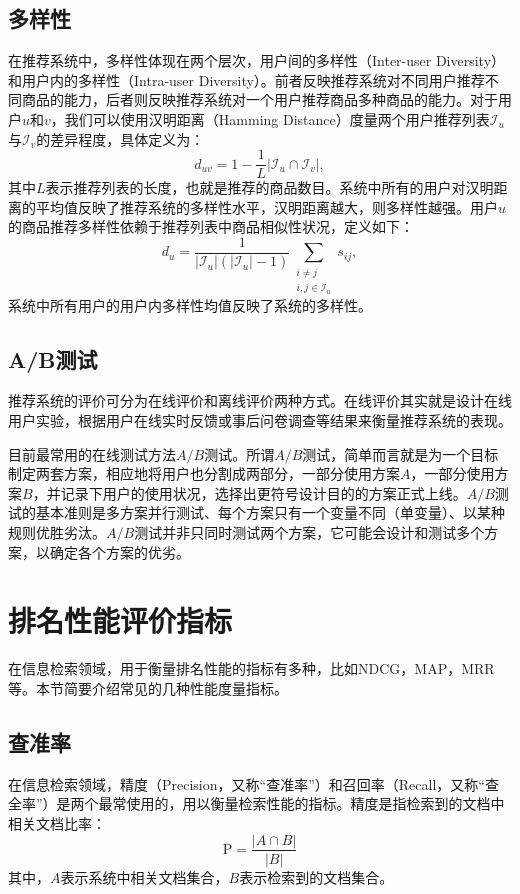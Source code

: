 \subsection{多样性}
在推荐系统中，多样性体现在两个层次，用户间的多样性（Inter-user Diversity）和用户内的多样性（Intra-user Diversity）。前者反映推荐系统对不同用户推荐不同商品的能力，后者则反映推荐系统对一个用户推荐商品多种商品的能力。对于用户$u$和$v$，我们可以使用汉明距离（Hamming Distance）度量两个用户推荐列表$\mathcal I_u$与$\mathcal I_v$的差异程度，具体定义为：
\begin{equation}\label{eq:inter-diversity}
    d_{uv} = 1 - \frac{1}{L} |\mathcal I_u \cap \mathcal I_v|,
\end{equation}
其中$L$表示推荐列表的长度，也就是推荐的商品数目。系统中所有的用户对汉明距离的平均值反映了推荐系统的多样性水平，汉明距离越大，则多样性越强。用户$u$的商品推荐多样性依赖于推荐列表中商品相似性状况，定义如下：
\begin{equation}\label{eq:intra-diversity}
    d_u = \frac{1}{|\mathcal I_u|(|\mathcal I_u|-1)} \sum\limits_{\substack{i\ne j\\i,j \in \mathcal I_u}} s_{ij},
\end{equation}
系统中所有用户的用户内多样性均值反映了系统的多样性。

\subsection{A/B测试}
推荐系统的评价可分为在线评价和离线评价两种方式。在线评价其实就是设计在线用户实验，根据用户在线实时反馈或事后问卷调查等结果来衡量推荐系统的表现。

目前最常用的在线测试方法$A/B$测试。所谓$A/B$测试，简单而言就是为一个目标制定两套方案，相应地将用户也分割成两部分，一部分使用方案$A$，一部分使用方案$B$，并记录下用户的使用状况，选择出更符号设计目的的方案正式上线。$A/B$测试的基本准则是多方案并行测试、每个方案只有一个变量不同（单变量）、以某种规则优胜劣汰。$A/B$测试并非只同时测试两个方案，它可能会设计和测试多个方案，以确定各个方案的优劣\cite{zhu2012recmetric}。

\section{排名性能评价指标}
在信息检索领域，用于衡量排名性能的指标有多种，比如NDCG\cite{jarvelin2000ir,jarvelin2002cumulated}，MAP\cite{baeza1999modern}，MRR\cite{voorhees1999trec}等。本节简要介绍常见的几种性能度量指标。

\subsection{查准率}
在信息检索领域，精度（Precision，又称“查准率”）和召回率（Recall，又称“查全率”）是两个最常使用的，用以衡量检索性能的指标。精度是指检索到的文档中相关文档比率：
\begin{equation}\label{eq:precision}
    \text{P} = \frac{|A\cap B|}{|B|}
\end{equation}
其中，$A$表示系统中相关文档集合，$B$表示检索到的文档集合。

